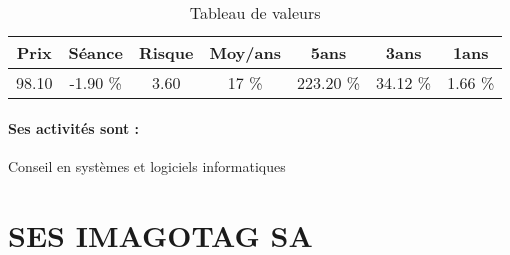\documentclass[11pt,a4paper]{report}%
\begin{document}
\begin{table}[H]
  \centering
    \begin{tabular}{|c|c|c|c|c|c|c|}
    \hline
    Prix & Séance & Risque  & Moy/ans & 5ans & 3ans & 1ans \\
    \hline
    98.10 &    -1.90 \%    & 3.60 & 17 \% & 223.20 \% & 34.12 \% & 1.66 \% \\
    \hline
    \end{tabular}%
        \label{tab:table_DEVOTEAM}%
      \caption{Tableau de valeurs}
\end{table}%

\paragraph{Ses activités sont : } Conseil en systèmes et logiciels informatiques 
    
    \newpage

\section{SES IMAGOTAG SA}
\end{document}
